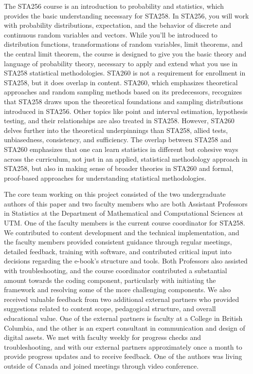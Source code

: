 \documentclass[11pt]{article}
\begin{document}
The STA256 course is an introduction to probability and statistics, which provides the basic understanding necessary for STA258. In STA256, you will work with probability distributions, expectation, and the behavior of discrete and continuous random variables and vectors. While you'll be introduced to distribution functions, transformations of random variables, limit theorems, and the central limit theorem, the course is designed to give you the basic theory and language of probability theory, necessary to apply and extend what you use in STA258 statistical methodologies. STA260 is not a requirement for enrollment in STA258, but it does overlap in content. STA260, which emphasizes theoretical approaches and random sampling methods based on its predecessors, recognizes that STA258 draws upon the theoretical foundations and sampling distributions introduced in STA256. Other topics like point and interval estimation, hypothesis testing, and their relationships are also treated in STA258. However, STA260 delves further into the theoretical underpinnings than STA258, allied tests, unbiasedness, consistency, and sufficiency. The overlap between STA258 and STA260 emphasizes that one can learn statistics in different but cohesive ways across the curriculum, not just in an applied, statistical methodology approach in STA258, but also in making sense of broader theories in STA260 and formal, proof-based approaches for understanding statistical methodologies.

The core team working on this project consisted of the two undergraduate authors of this paper and two faculty members who are both Assistant Professors in Statistics at the Department of Mathematical and Computational Sciences at UTM. One of the faculty members is the current course coordinator for STA258.
We contributed to content development and the technical implementation, and the faculty members provided consistent guidance through regular meetings, detailed feedback, training with software, and contributed critical input into decisions regarding the e-book’s structure and tools.
Both Professors also assisted with troubleshooting, and the course coordinator contributed a substantial amount towards the coding component, particularly with initiating the framework and resolving some of the more challenging components.
We also received valuable feedback from two additional external partners 
who provided suggestions related to content scope, pedagogical structure, and overall educational value.
One of the external partners is faculty at a College in British Columbia, and the other is an expert consultant in communication and design of digital assets.
We met with faculty weekly for progress checks and troubleshooting, and with our external partners approximately once a month to provide progress updates and to receive feedback.
One of the authors was living outside of Canada and joined meetings through video conference.
\end{document}
